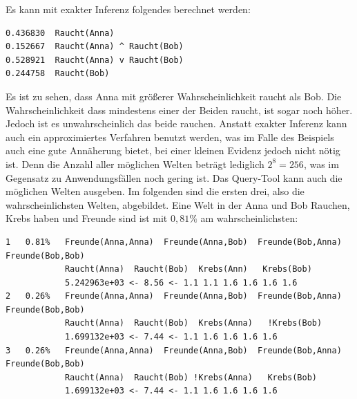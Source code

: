 Es kann mit exakter Inferenz folgendes berechnet werden: 
\begin{lstlisting}[backgroundcolor=\color{backcolour}]
0.436830  Raucht(Anna)
0.152667  Raucht(Anna) ^ Raucht(Bob)
0.528921  Raucht(Anna) v Raucht(Bob)
0.244758  Raucht(Bob)
\end{lstlisting} 
Es ist zu sehen, dass Anna mit größerer Wahrscheinlichkeit raucht als Bob. Die Wahrscheinlichkeit dass mindestens einer der Beiden raucht, ist sogar noch höher. Jedoch ist es unwahrscheinlich das beide rauchen. \newline
Anstatt exakter Inferenz kann auch ein approximiertes Verfahren benutzt werden, was im Falle des Beispiels auch eine gute Annäherung bietet, bei einer kleinen Evidenz jedoch nicht nötig ist. Denn die Anzahl aller möglichen Welten beträgt lediglich $2^8 = 256$, was im Gegensatz zu Anwendungsfällen noch gering ist. Das Query-Tool kann auch die möglichen Welten ausgeben. Im folgenden sind die ersten drei, also die wahrscheinlichsten Welten, abgebildet. Eine Welt in der Anna und Bob Rauchen, Krebs haben und Freunde sind ist mit $0,81\%$ am wahrscheinlichsten:
\begin{lstlisting}[backgroundcolor=\color{backcolour}]
1   0.81%   Freunde(Anna,Anna)  Freunde(Anna,Bob)  Freunde(Bob,Anna)  Freunde(Bob,Bob)
            Raucht(Anna)  Raucht(Bob)  Krebs(Ann)   Krebs(Bob)
            5.242963e+03 <- 8.56 <- 1.1 1.1 1.6 1.6 1.6 1.6
2   0.26%   Freunde(Anna,Anna)  Freunde(Anna,Bob)  Freunde(Bob,Anna)  Freunde(Bob,Bob)
            Raucht(Anna)  Raucht(Bob)  Krebs(Anna)   !Krebs(Bob)
            1.699132e+03 <- 7.44 <- 1.1 1.6 1.6 1.6 1.6
3   0.26%   Freunde(Anna,Anna)  Freunde(Anna,Bob)  Freunde(Bob,Anna)  Freunde(Bob,Bob)
            Raucht(Anna)  Raucht(Bob) !Krebs(Anna)   Krebs(Bob)
            1.699132e+03 <- 7.44 <- 1.1 1.6 1.6 1.6 1.6
\end{lstlisting}  